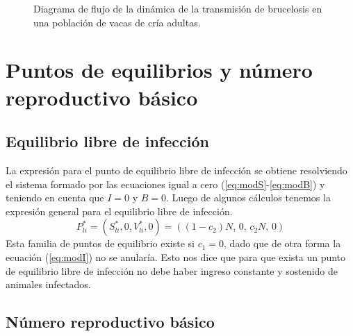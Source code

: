 \documentclass[12pt,preprint,times]{elsarticle}
\begin{document}
\begin{figure}[h]
\centering
{} 
\caption[Figura]{Diagrama de flujo de la dinámica de la transmisión de brucelosis en una población de vacas  de cría adultas.}
\end{figure}




\section{Puntos de equilibrios y número reproductivo básico}

\subsection{Equilibrio libre de infección}
La expresión para el punto de  equilibrio libre de infección se obtiene  resolviendo el sistema formado por las ecuaciones igual a cero (\ref{eq:modS}-\ref{eq:modB})  y teniendo en cuenta que $I=0$ y $B=0$. Luego de algunos cálculos tenemos la expresión general para el equilibrio libre de infección.
  \begin{equation}
P^*_{li} =(S^*_{li},0,V^*_{li},0)= ( (1-c_2)N, \, 0, \, c_2N, \, 0) \label{eq:ELI}
\end{equation}
 Esta familia de puntos de equilibrio existe si $c_1=0$, dado que de otra forma la ecuación (\ref{eq:modI}) no se anularía. Esto nos dice que para que exista un punto de equilibrio libre de infección no debe haber ingreso constante y sostenido de animales infectados. 
 
\subsection{Número reproductivo básico}






\end{document}
